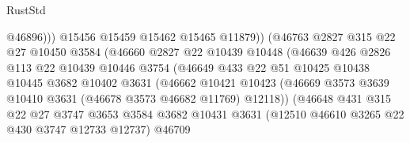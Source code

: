 \begin{lexlean}{RustStd}
\begin{coremodule}
                                        @46896)))
                                  @15456
                                  @15459
                                  @15462
                                  @15465
                                  @11879))
                              (@46763
                                @2827
                                @315
                                @22
                                @27
                                @10450
                                @3584
                                (@46660
                                  @2827
                                  @22
                                  @10439
                                  @10448
                                  (@46639
                                    @426
                                    @2826
                                    @113
                                    @22
                                    @10439
                                    @10446
                                    @3754
                                    (@46649
                                      @433
                                      @22
                                      @51
                                      @10425
                                      @10438
                                      @10445
                                      @3682
                                      @10402
                                      @3631
                                      (@46662
                                        @10421
                                        @10423
                                        (@46669
                                          @3573
                                          @3639
                                          @10410
                                          @3631
                                          (@46678 @3573 @46682 @11769)
                                          @12118))
                                      (@46648
                                        @431
                                        @315
                                        @22
                                        @27
                                        @3747
                                        @3653
                                        @3584
                                        @3682
                                        @10431
                                        @3631
                                        (@12510 @46610 @3265 @22 @430 @3747 @12733 @12737)
                                        @46709

\end{coremodule}
\end{lexlean}
